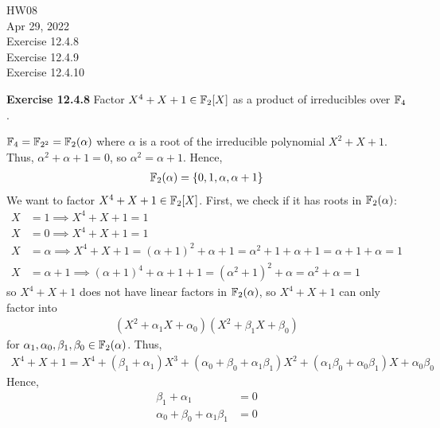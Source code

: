 \documentclass{article}
\begin{document}
\maketitle
HW08 \\
Apr 29, 2022 \\
Exercise 12.4.8\\
Exercise 12.4.9\\
Exercise 12.4.10\\
\pagebreak

\begin{homeworkProblem}
    \textbf{Exercise 12.4.8} Factor $X^4 + X + 1 \in \mathbb{F}_{2}[X]$ as a product of irreducibles over $\mathbb{F}_4$.

    \solution 

    $\mathbb{F}_4 = \mathbb{F}_{2^2} = \mathbb{F}_2 (\alpha)$ where $\alpha$ is a root of the irreducible polynomial
    $X^2 + X + 1$. Thus, $\alpha^2 + \alpha + 1 = 0$, so $\alpha^2 = \alpha + 1$. Hence,
    \begin{align}
        \mathbb{F}_2 (\alpha) = \{ 0,1,\alpha,\alpha+1 \}
    \end{align}
    We want to factor $X^4 + X + 1 \in \mathbb{F}_2[X]$. First, we check if it has
    roots in $\mathbb{F}_2 (\alpha)$: 
    \begin{align}
        X &= 1 \implies X^4 + X + 1 = 1\\
        X &= 0 \implies X^4 + X + 1 = 1\\
        X &= \alpha \implies X^4 + X + 1 = (\alpha+1)^2 + \alpha + 1 = \alpha^2 + 1 + \alpha + 1 = \alpha + 1 + \alpha = 1\\
        X &= \alpha + 1 \implies (\alpha + 1)^4 + \alpha + 1 + 1 = (\alpha^2 + 1)^2 + \alpha = \alpha^2 + \alpha = 1
    \end{align}
    so $X^4 + X + 1$ does not have linear factors in $\mathbb{F}_2(\alpha)$, so $X^4 + X + 1$
    can only factor into 
    \begin{align}
        (X^2 + \alpha_1 X + \alpha_0)(X^2 + \beta_1 X + \beta_0)
    \end{align}
    for $\alpha_1, \alpha_0, \beta_1, \beta_0 \in \mathbb{F}_2 (\alpha)$. Thus,
    \begin{align}
        X^4 + X + 1 = X^4 + (\beta_1 + \alpha_1)X^3 + 
        (\alpha_0 + \beta_0 + \alpha_1 \beta_1) X^2 +
        (\alpha_1 \beta_0 + \alpha_0 \beta_1) X +
        \alpha_0 \beta_0
    \end{align}
    Hence,
    \begin{align}
        \beta_1 + \alpha_1 &= 0\\
        \alpha_0 + \beta_0 + \alpha_1 \beta_1 &= 0\\

\end{align}
\end{homeworkProblem}
\end{document}
